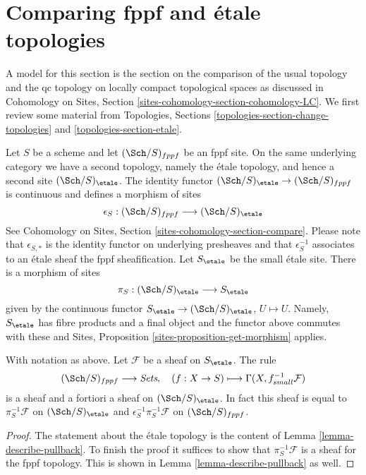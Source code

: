 \section{Comparing fppf and \'etale topologies}
\label{section-fppf-etale}

\noindent
A model for this section is the section on the comparison of the
usual topology and the qc topology on locally compact topological
spaces as discussed in Cohomology on Sites, Section
\ref{sites-cohomology-section-cohomology-LC}.
We first review some material from
Topologies, Sections
\ref{topologies-section-change-topologies} and
\ref{topologies-section-etale}.

\medskip\noindent
Let $S$ be a scheme and let $(\Sch/S)_{fppf}$ be an fppf site.
On the same underlying category we have a second topology,
namely the \'etale topology, and hence a second site
$(\Sch/S)_\etale$. The identity functor
$(\Sch/S)_\etale \to (\Sch/S)_{fppf}$ is continuous and defines
a morphism of sites
$$
\epsilon_S : (\Sch/S)_{fppf} \longrightarrow (\Sch/S)_\etale
$$
See Cohomology on Sites, Section \ref{sites-cohomology-section-compare}.
Please note that $\epsilon_{S, *}$ is the identity functor on underlying
presheaves and that $\epsilon_S^{-1}$ associates to an \'etale sheaf the
fppf sheafification. Let $S_\etale$ be the small \'etale site.
There is a morphism of sites
$$
\pi_S : (\Sch/S)_\etale \longrightarrow S_\etale
$$
given by the continuous functor
$S_\etale \to (\Sch/S)_\etale$, $U \mapsto U$.
Namely, $S_\etale$ has fibre products and a final object and the
functor above commutes with these and
Sites, Proposition \ref{sites-proposition-get-morphism} applies.

\begin{lemma}
\label{lemma-describe-pullback-pi-fppf}
With notation as above.
Let $\mathcal{F}$ be a sheaf on $S_\etale$. The rule
$$
(\Sch/S)_{fppf} \longrightarrow \textit{Sets},\quad
(f : X \to S) \longmapsto \Gamma(X, f_{small}^{-1}\mathcal{F})
$$
is a sheaf and a fortiori a sheaf on $(\Sch/S)_\etale$.
In fact this sheaf is equal to
$\pi_S^{-1}\mathcal{F}$ on $(\Sch/S)_\etale$ and
$\epsilon_S^{-1}\pi_S^{-1}\mathcal{F}$ on $(\Sch/S)_{fppf}$.
\end{lemma}

\begin{proof}
The statement about the \'etale topology is the content
of Lemma \ref{lemma-describe-pullback}. To finish the proof it
suffices to show that $\pi_S^{-1}\mathcal{F}$ is a sheaf for the fppf
topology. This is shown in Lemma \ref{lemma-describe-pullback}
as well.
\end{proof}

